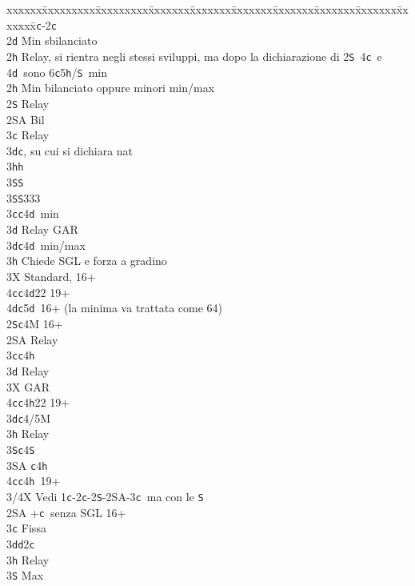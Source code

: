 \documentclass[a4paper,italian]{article}
\newcommand{\BS}{\small{\texttt{S}}}
\newcommand{\BC}{\small{\texttt{c}}}
\newcommand{\BD}{\small{\texttt{d}}}
\newcommand{\BH}{\small{\texttt{h}}}
\newenvironment{bidtable}
{\begin{tabbing}

    xxxxxx\=xxxxxxxxx\=xxxxxxxxx\=xxxxxxx\=xxxxxxx\=xxxxxxx\=xxxxxxx\=xxxxxxx\=xxxxxxx\=xxxxxxx\=\kill}
{\end{tabbing} }%
\begin{document}
\begin{bidtable}
    1\BC-2\BC\+\\
    2\BD \> Min sbilanciato\+\\
    2\BH \> Relay, si rientra negli stessi sviluppi, ma dopo la dichiarazione di 2\BS\ 4\BC\ e 4\BD\ sono 6\BC 5\BH /\BS\ min\-\\
    2\BH \> Min bilanciato oppure minori min/max\+\\
    2\BS \> Relay\+\\
    2\small{SA} \> Bil\+\\
    3\BC \> Relay\+\\
    3\BD {}\BC , su cui si dichiara nat\\
    3\BH {}\BH \+\\
    3\BS {}\BS \-\\
    3\BS {}\BS 333\-\-\\
    3\BC {}\BC 4\BD\ min\+\\
    3\BD \> Relay GAR\-\\
    3\BD {}\BC 4\BD\ min/max\+\\
    3\BH \> Chiede SGL e forza a gradino\-\\
    3X \> Standard, 16+\\
    4\BC {}\BC 4\BD 22 19+\\
    4\BD {}\BC 5\BD\ 16+ (la minima va trattata come 64)\-\-\\
    2\BS {}\BC 4M 16+\+\\
    2\small{SA} \> Relay\+\\
    3\BC {}\BC 4\BH \+\\
    3\BD \> Relay\+\\
    3X \> GAR\\
    4\BC {}\BC 4\BH 22 19+\-\-\\
    3\BD {}\BC 4/5M\+\\
    3\BH \> Relay\+\\
    3\BS {}\BC 4\BS \\
    3\small{SA} \BC 4\BH \\
    4\BC {}\BC 4\BH\ 19+\-\-\\
    3/4X \> Vedi 1\BC -2\BC -2\BS -2\small{SA}-3\BC\ ma con le \BS \-\-\\
    2\small{SA} +\BC\ senza SGL 16+\+\\
    3\BC \> Fissa\\
    3\BD {}\BD 2\BC \\
    3\BH \> Relay\+\\
    3\BS \> Max\\

\end{bidtable}
\end{document}
